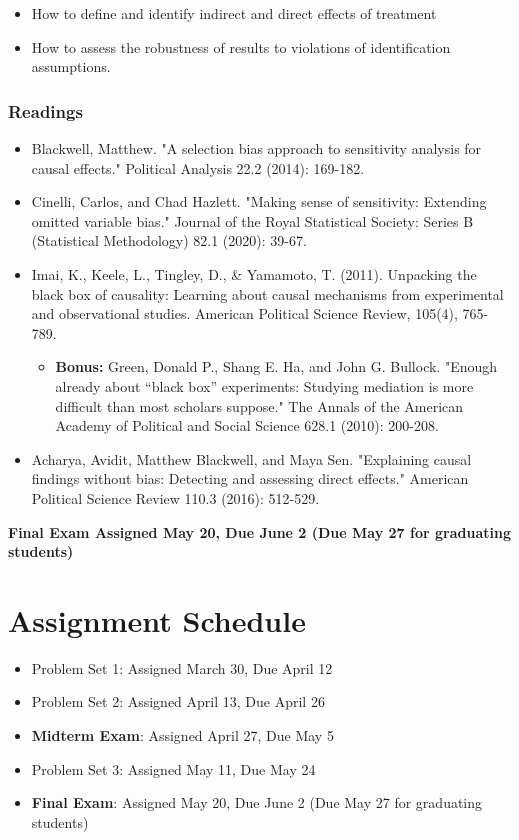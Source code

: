 \documentclass[11pt, article, oneside]{memoir}
\theoremstyle{Assumption}
\begin{document}
\begin{itemize}
\item How to define and identify indirect and direct effects of treatment
\item How to assess the robustness of results to violations of identification assumptions. 
\end{itemize}

\subsubsection*{Readings}

\begin{itemize}
\item Blackwell, Matthew. "A selection bias approach to sensitivity analysis for causal effects." Political Analysis 22.2 (2014): 169-182.
\item Cinelli, Carlos, and Chad Hazlett. "Making sense of sensitivity: Extending omitted variable bias." Journal of the Royal Statistical Society: Series B (Statistical Methodology) 82.1 (2020): 39-67.
\item Imai, K., Keele, L., Tingley, D., \& Yamamoto, T. (2011). Unpacking the black box of causality: Learning about causal mechanisms from experimental and observational studies. American Political Science Review, 105(4), 765-789.
\begin{itemize}
\item \textbf{Bonus:} Green, Donald P., Shang E. Ha, and John G. Bullock. "Enough already about “black box” experiments: Studying mediation is more difficult than most scholars suppose." The Annals of the American Academy of Political and Social Science 628.1 (2010): 200-208.
\end{itemize}
\item Acharya, Avidit, Matthew Blackwell, and Maya Sen. "Explaining causal findings without bias: Detecting and assessing direct effects." American Political Science Review 110.3 (2016): 512-529.
\end{itemize}

\textbf{Final Exam Assigned May 20, Due June 2 (Due May 27 for graduating students)}

\section*{Assignment Schedule}

\begin{itemize}
\item Problem Set 1: Assigned March 30, Due April 12
\item Problem Set 2: Assigned April 13, Due April 26
\item \textbf{Midterm Exam}: Assigned April 27, Due May 5
\item Problem Set 3: Assigned May 11, Due May 24
\item \textbf{Final Exam}: Assigned May 20, Due June 2 (Due May 27 for graduating students)
\end{itemize}
\end{document}
